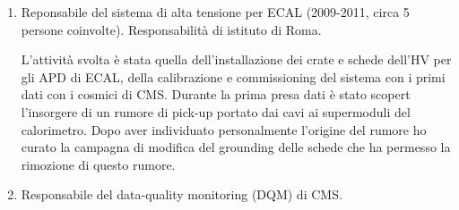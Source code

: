 \documentclass[11pt,twoside,a4paper]{article}
\begin{document}
\begin{enumerate}
  \item Reponsabile del sistema di alta tensione per ECAL (2009-2011,
    circa 5 persone coinvolte). Responsabilit\`a di istituto di Roma.

    L'attivit\`a svolta \`e stata quella dell'installazione dei crate
    e schede dell'HV per gli APD di ECAL, della calibrazione e
    commissioning del sistema con i primi dati con i cosmici di CMS.
    Durante la prima presa dati \`e stato scopert l'insorgere di un
    rumore di pick-up portato dai cavi ai supermoduli del
    calorimetro. Dopo aver individuato personalmente l'origine del
    rumore ho curato la campagna di modifica del grounding delle
    schede che ha permesso la rimozione di questo rumore.

  \item Responsabile del data-quality monitoring (DQM) di CMS.
    
\end{enumerate}
\end{document}
